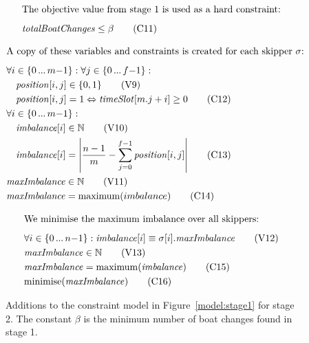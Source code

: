 \documentclass{llncs}
\newcommand{\timeSlot}{\mathit{timeSlot}}
\newcommand{\totalBoatChanges}{\mathit{totalBoatChanges}}
\newcommand{\position}{\mathit{position}}
\newcommand{\imbalance}{\mathit{imbalance}}
\newcommand{\maxImbalance}{\mathit{maxImbalance}}
\newcommand{\minimise}{\mathrm{minimise}}
\newcommand{\maximum}{\mathrm{maximum}}
\DeclarePairedDelimiter\abs{\lvert}{\rvert}
\newcommand\nldots{\,\hbox to 0.8em{.\hss.\hss.}\,}
\begin{document}
\begin{figure}[tb]
\setlength{\mathindent}{1em}
\setlength{\abovedisplayskip}{0pt}
\setlength{\belowdisplayskip}{0pt}
\setlength{\abovecaptionskip}{0pt}
\begin{framed}
\begin{align}
    \intertext{The objective value from stage 1 is used as a hard constraint:\smallskip}
    & \totalBoatChanges \leq \beta \tag{C11} \label{C11}
\end{align}
\end{framed}\begin{framed}
\begin{align}
    \intertext{A copy of these variables and constraints is created for each skipper $\sigma$:\smallskip}
    & \forall i \in \{ 0 \nldots m{-}1 \} : \forall j \in \{ 0 \nldots f{-}1 \} : \nonumber \\
    & \hspace*{1em} \position[{i,j}] \in \{0,1\} \tag{V9} \label{V9} \\
    & \hspace*{1em} \position[{i,j}] = 1 \Leftrightarrow \timeSlot[{m.j+i}] \geq 0 \tag{C12} \label{C12} \\
    & \forall i \in \{ 0 \nldots m{-}1 \} : \nonumber \\
    & \hspace*{1em} \imbalance[{i}] \in \mathbb{N} \label{V10} \tag{V10} \\
    & \hspace*{1em} \imbalance[{i}] = \abs*{\frac{n-1}{m} - \sum_{j=0}^{f-1} \position[{i,j}]} \label{C13} \tag{C13} \\
    & \maxImbalance \in \mathbb{N} \label{V11} \tag{V11} \\
    & \maxImbalance = \maximum(imbalance) \label{C14} \tag{C14}
\end{align}
\end{framed}\begin{framed}
\begin{align}
    \intertext{We minimise the maximum imbalance over all skippers:\smallskip}
    & \forall i \in \{ 0 \nldots n{-}1 \} : \imbalance[{i}] \equiv \sigma[{i}].\maxImbalance \label{V12} \tag{V12} \\
    & \maxImbalance \in \mathbb{N} \label{V13} \tag{V13} \\
    & \maxImbalance = \maximum(\imbalance) \label{C15} \tag{C15} \\
    & \minimise(\maxImbalance) \label{C16} \tag{C16}
\end{align}
\end{framed}
\caption{Additions to the constraint model in Figure~\ref{model:stage1} for
stage 2. The constant $\beta$ is the minimum number of boat changes found in
stage 1.}\label{model:stage2}
\end{figure}
\end{document}
